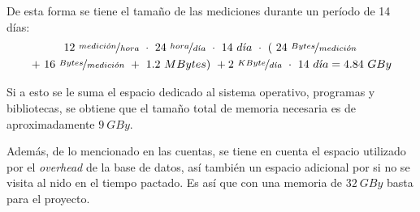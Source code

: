 De esta forma se tiene el tamaño de las mediciones durante un período de 14 días:
\begin{multline*}
	12 \ \nicefrac{medici\acute{o}n}{hora} \  \cdot \ 24 \ \nicefrac{hora}{d\acute{\imath}a} \  \cdot \ 14 \ d\acute{\imath}a \  \cdot \ \left( \ 24 \  \nicefrac{Bytes}{medici\acute{o}n} \right. \\ \left. + \ 16 \ \nicefrac{Bytes}{medici\acute{o}n} \ + \ 1.2 \ MBytes \right) \ + 2 \ \nicefrac{KByte}{d\acute{\imath}a} \  \cdot \  14 \ d\acute{\imath}a = 4.84 \ GBy
\end{multline*}

Si a esto se le suma el espacio dedicado al sistema operativo, programas y bibliotecas, se obtiene que el tamaño total de memoria necesaria es de aproximadamente $9 \ GBy$.

Además, de lo mencionado en las cuentas, se tiene en cuenta el espacio utilizado por el \textit{overhead} de la base de datos, así también un espacio adicional por si no se visita al nido en el tiempo pactado. Es así que con una memoria de $32 \ GBy$ basta para el proyecto.